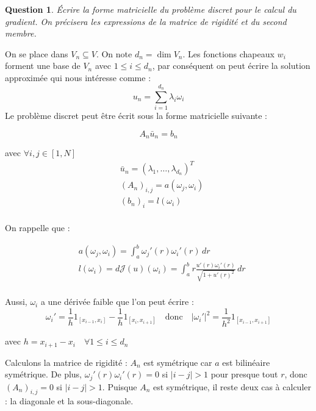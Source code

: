 \documentclass{article}
\newcommand{\Abs}[1]{ \left| #1 \right| }
\newcommand{\FunctionWithSqrt}[1]{ \sqrt{1 + #1 ^2} }
\newcommand{\Integral}[4]{ \int_{#1}^{#2} #3 \, d#4 }
\newtheorem{question}{Question}[subsection]
\newenvironment{answer}
  {\color{blue}}
  {}
\newcommand{\QuestionAnswer}[2]{
    \begin{question}
        #1
    \end{question}
    \begin{answer}
        #2
    \end{answer}
}
\newcommand{\FunctionJ}{\mathcal{J}}
\begin{document}
\QuestionAnswer{
    Écrire la forme matricielle du problème discret pour le calcul du gradient. On précisera les expressions de la matrice de rigidité et du second membre.
}{

    On se place dans $V_n \subseteq V$. On note $d_n = \dim V_n$. Les fonctions chapeaux $w_i$ forment une base de $V_n$ avec $1 \leq i \leq d_n$, par conséquent on peut écrire la solution approximée qui nous intéresse comme :
    $$u_n = \sum^{d_n}_{i=1} \lambda_i \omega_i$$
    Le problème discret peut être écrit sous la forme matricielle suivante :

    \begin{equation*}
        A_n \bar{u}_n = b_n
    \end{equation*}

    avec $\forall i, j \in [1, N]$
    \begin{align*}
        &\bar{u}_n = (\lambda_1, \dots ,\lambda_{d_n})^T \\
        &(A_n)_{i,j} = a(\omega_j, \omega_i) \\
        &(b_n)_{i} = l(\omega_i) \\
    \end{align*}

    On rappelle que :

    \begin{align*}
        & a(\omega_j, \omega_i) = \Integral{a}{b}{\omega_j'(r)\omega_i'(r)}{r} \\
        & l(\omega_i) = d\FunctionJ(u)(\omega_i) = 
            \Integral{a}{b}{ r \frac{u'(r)\omega_i'(r)}{\FunctionWithSqrt{u'(r)}} }{r} \\
    \end{align*}

    Aussi, $\omega_i$ a une dérivée faible que l'on peut écrire :
    $$\omega_i' = \frac{1}{h} 1_{[x_{i-1}, x_i]} - \frac{1}{h} 1_{[x_i, x_{i+1}]} \quad \text{donc} \quad \Abs{\omega_i'}^2 = \frac{1}{h^2} 1_{[x_{i-1}, x_{i+1}]}$$

    avec $h = x_{i+1} - x_i \quad \forall 1 \leq i \leq d_n$\newline

    Calculons la matrice de rigidité :\newline
    $A_n$ est symétrique car $a$ est bilinéaire symétrique. De plus, $\omega_j'(r)\omega_i'(r) = 0$ si $\Abs{i - j} > 1$ pour presque tout $r$, donc $(A_n)_{i,j} = 0$ si $\Abs{i - j} > 1$. Puisque $A_n$ est symétrique, il reste deux cas à calculer : la diagonale et la sous-diagonale.\newline

}
\end{document}
